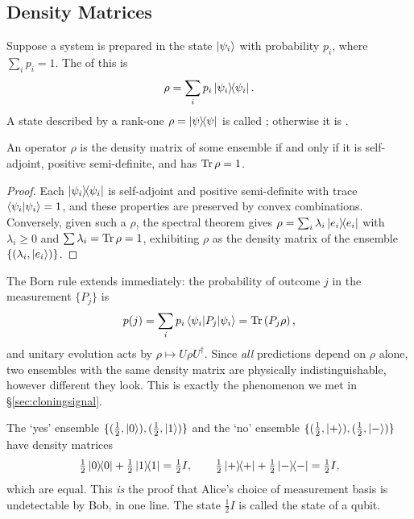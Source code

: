 \documentclass[a4paper]{scrartcl}
\begin{document}
\subsection{Density Matrices}

\begin{definition}
	Suppose a system is prepared in the state $\ket{\psi_i}$ with probability $p_i$, where $\sum_ip_i=1$. The  of this  is
	$$\rho = \sum_ip_i\op{\psi_i}{\psi_i}.$$
	A state described by a rank-one $\rho = \op{\psi}{\psi}$ is called ; otherwise it is .
\end{definition}

\begin{proposition}
	An operator $\rho$ is the density matrix of some ensemble if and only if it is self-adjoint, positive semi-definite, and has $\Tr\rho = 1$.
\end{proposition}

\begin{proof}
	Each $\op{\psi_i}{\psi_i}$ is self-adjoint and positive semi-definite with trace $\ip{\psi_i}{\psi_i} = 1$, and these properties are preserved by convex combinations. Conversely, given such a $\rho$, the spectral theorem gives $\rho = \sum_i\lambda_i\op{e_i}{e_i}$ with $\lambda_i\geq0$ and $\sum\lambda_i = \Tr\rho = 1$, exhibiting $\rho$ as the density matrix of the ensemble $\{(\lambda_i,\ket{e_i})\}$.
\end{proof}

The Born rule extends immediately: the probability of outcome $j$ in the measurement $\{P_j\}$ is
$$p(j) = \sum_ip_i\mel{\psi_i}{P_j}{\psi_i} = \Tr\left(P_j\rho\right),$$
and unitary evolution acts by $\rho\mapsto U\rho U^\dagger$. Since \emph{all} predictions depend on $\rho$ alone, two ensembles with the same density matrix are physically indistinguishable, however different they look. This is exactly the phenomenon we met in \S\ref{sec:cloningsignal}.

\begin{example}
	The `yes' ensemble $\{(\tfrac12,\ket0),(\tfrac12,\ket1)\}$ and the `no' ensemble $\{(\tfrac12,\ket+),(\tfrac12,\ket-)\}$ have density matrices
	$$\tfrac12\op{0}{0}+\tfrac12\op{1}{1} = \tfrac12 I, \qquad \tfrac12\op{+}{+} + \tfrac12\op{-}{-} = \tfrac12I,$$
	which are equal. This \emph{is} the proof that Alice's choice of measurement basis is undetectable by Bob, in one line. The state $\tfrac12I$ is called the  state of a qubit.
\end{example}
\end{document}
